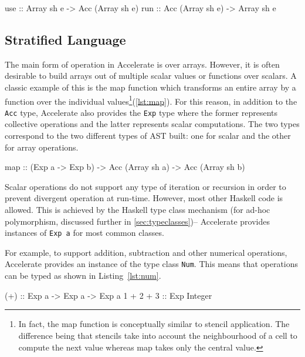 \documentclass[
    12pt,
    a4paper,
    twoside,
    openright,
    ]{scrbook}
\begin{document}
\begin{hflisting}[label={lst:runuse}, caption=The basic constructors and
  destructors for moving arrays too and from the GPU in Accelerate.]
use :: Array sh e -> Acc (Array sh e)
run :: Acc (Array sh e) -> Array sh e
\end{hflisting}

\subsection{Stratified Language}

The main form of operation in Accelerate is over arrays. However, it is often
desirable to build arrays out of multiple scalar values or functions over
scalars. A classic example of this is the map function which transforms an
entire array by a function over the individual values\footnote{In fact, the map
  function is conceptually similar to stencil application. The difference being
  that stencils take into account the neighbourhood of a cell to compute
  the next value whereas map takes only the central value.}(\autoref{lst:map}). For this reason, in addition to the \texttt{Acc} type,
Accelerate also provides the \texttt{Exp} type where the former represents
collective operations and the latter represents scalar computations. The two
types correspond to the two different types of AST built: one for scalar and the
other for array operations.

\begin{hflisting}[label={lst:map}, caption=The type of the \texttt{map}
  operation as defined by Accelerate.]
map :: (Exp a -> Exp b) -> Acc (Array sh a) -> Acc (Array sh b)
\end{hflisting}

Scalar operations do not support any type of iteration or recursion in order to
prevent divergent operation at run-time. However, most other Haskell code is
allowed. This is achieved by the Haskell type class mechanism (for ad-hoc
polymorphism, discussed further in \autoref{sec:typeclasses})-- Accelerate
provides instances of \texttt{Exp a} for most common classes.

For example, to support addition, subtraction and other numerical operations,
Accelerate provides an instance of the type class \texttt{Num}. This means that
operations can be typed as shown in Listing~\ref{lst:num}.

\begin{hflisting}[label={lst:num}, caption=The type of addition overloaded by Accelerate.]
(+) :: Exp a -> Exp a -> Exp a
1 + 2 + 3 :: Exp Integer
\end{hflisting}
\end{document}
